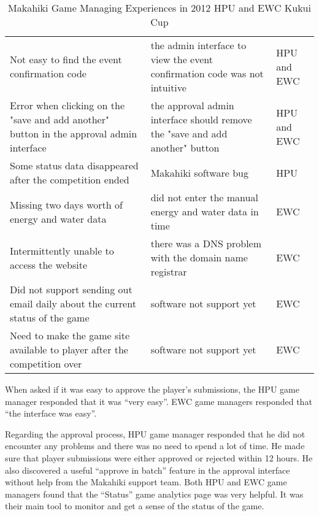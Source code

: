 \begin{table}[ht!]
  \centering
  \begin{tabular}{|P{0.4\columnwidth}|P{0.4\columnwidth}|P{0.1\columnwidth}|}
    \hline
    \centering {} &
    \centering {} & 
     \\
    \hline
    Not easy to find the event confirmation code  & the admin interface to view the event confirmation code was not intuitive & HPU and EWC \\
    \hline
    Error when clicking on the "save and add another" button in the approval admin interface &  the approval admin interface should remove the "save and add another" button & HPU and EWC \\
    \hline
    Some status data disappeared after the competition ended & Makahiki software bug & HPU\\
    \hline
    Missing two days worth of energy and water data & did not enter the manual energy and water data in time & EWC\\
    \hline
    Intermittently unable to access the website  & there was a DNS problem with the domain name registrar & EWC\\
    \hline
    Did not support sending out email daily about the current status of the game & software not support yet & EWC \\
    \hline
    Need to make the game site available to player after the competition over & software not support yet & EWC \\
    \hline
  \end{tabular}
  \caption{Makahiki Game Managing Experiences in 2012 HPU and EWC Kukui Cup}
  \label{fig:hpu-ewc-manage}
\end{table}

When asked if it was easy to approve the player's submissions, the HPU game manager responded that it was ``very easy''. EWC game managers responded that ``the interface was easy''.

Regarding the approval process, HPU game manager responded that he did not encounter any problems and there was no need to spend a lot of time. He made sure that player submissions were either approved or rejected within 12 hours. He also discovered a useful ``approve in batch'' feature in the approval interface without help from the Makahiki support team.  Both HPU and EWC game managers found that the ``Status'' game analytics page was very helpful. It was their main tool to monitor and get a sense of the status of the game.

